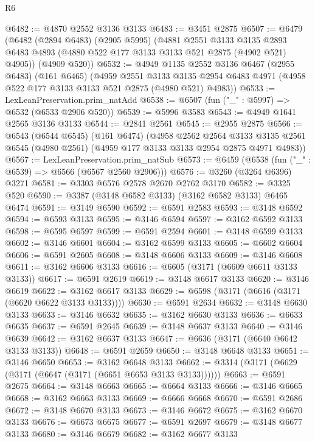 \begin{lexlean}{R6}
\begin{coremodule}
@6482 := @4870 @2552 @3136 @3133
@6483 := @3451 @2875
@6507 := @6479
    (@6482
      (@2894 @6483)
      (@2905 @5995)
      (@4881
        @2551
        @3133
        @3135
        @2893
        @6483
        @4893
        (@4880 @522 @177 @3133 @3133 @521 @2875 (@4902 @521) @4905))
      (@4909 @520))
@6532 := @4949
    @1135
    @2552
    @3136
    @6467
    (@2955 @6483)
    (@161 @6465)
    (@4959
      @2551
      @3133
      @3135
      @2954
      @6483
      @4971
      (@4958 @522 @177 @3133 @3133 @521 @2875 (@4980 @521) @4983))
@6533 := LexLeanPreservation.prim_natAdd
@6538 := @6507 (fun ("_" : @5997) => @6532 (@6533 @2906 @520))
@6539 := @5996 @3583
@6543 := @4949 @1641 @2565 @3136 @3133
@6544 := @2841 @2561
@6545 := @2955 @2875
@6566 := @6543
    (@6544 @6545)
    (@161 @6474)
    (@4958
      @2562
      @2564
      @3133
      @3135
      @2561
      @6545
      (@4980 @2561)
      (@4959 @177 @3133 @3133 @2954 @2875 @4971 @4983))
@6567 := LexLeanPreservation.prim_natSub
@6573 := @6459 (@6538 (fun ("_" : @6539) => @6566 (@6567 @2560 @2906)))
@6576 := @3260 (@3264 @6396) @3271
@6581 := @3303 @6576 @2578 @2670 @2762 @3170
@6582 := @3325 @520
@6590 := @3387 (@3148 @6582 @3133) (@3162 @6582 @3133) @6465 @6474
@6591 := @3149 @6590
@6592 := @6591 @2583
@6593 := @3148 @6592
@6594 := @6593 @3133
@6595 := @3146 @6594
@6597 := @3162 @6592 @3133
@6598 := @6595 @6597
@6599 := @6591 @2594
@6601 := @3148 @6599 @3133
@6602 := @3146 @6601
@6604 := @3162 @6599 @3133
@6605 := @6602 @6604
@6606 := @6591 @2605
@6608 := @3148 @6606 @3133
@6609 := @3146 @6608
@6611 := @3162 @6606 @3133
@6616 := @6605 (@3171 (@6609 @6611 @3133 @3133))
@6617 := @6591 @2619
@6619 := @3148 @6617 @3133
@6620 := @3146 @6619
@6622 := @3162 @6617 @3133
@6629 := @6598 (@3171 (@6616 (@3171 (@6620 @6622 @3133 @3133))))
@6630 := @6591 @2634
@6632 := @3148 @6630 @3133
@6633 := @3146 @6632
@6635 := @3162 @6630 @3133
@6636 := @6633 @6635
@6637 := @6591 @2645
@6639 := @3148 @6637 @3133
@6640 := @3146 @6639
@6642 := @3162 @6637 @3133
@6647 := @6636 (@3171 (@6640 @6642 @3133 @3133))
@6648 := @6591 @2659
@6650 := @3148 @6648 @3133
@6651 := @3146 @6650
@6653 := @3162 @6648 @3133
@6662 := @3314 (@3171 (@6629 (@3171 (@6647 (@3171 (@6651 @6653 @3133 @3133))))))
@6663 := @6591 @2675
@6664 := @3148 @6663
@6665 := @6664 @3133
@6666 := @3146 @6665
@6668 := @3162 @6663 @3133
@6669 := @6666 @6668
@6670 := @6591 @2686
@6672 := @3148 @6670 @3133
@6673 := @3146 @6672
@6675 := @3162 @6670 @3133
@6676 := @6673 @6675
@6677 := @6591 @2697
@6679 := @3148 @6677 @3133
@6680 := @3146 @6679
@6682 := @3162 @6677 @3133

\end{coremodule}
\end{lexlean}
